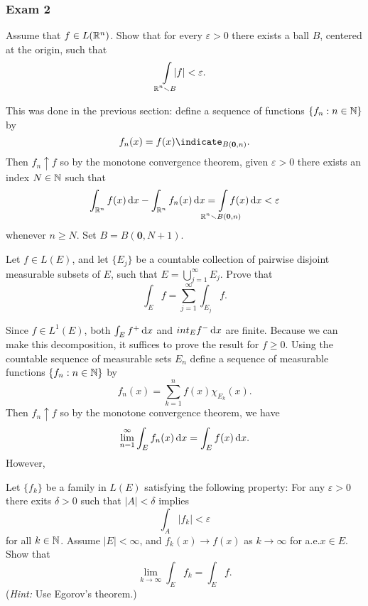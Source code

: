 \subsubsection{Exam 2}
\setcounter{exercise}{0}
\setcounter{equation}{0}

\begin{problem}
  Assume that \(f\in L(\mathbb{R}^n)\). Show that for every \(\varepsilon>0\)
  there exists a ball \(B\), centered at the origin, such that
  \[
    \int\limsclap{\bbR^n\setminus B}|f|<\varepsilon.
  \]
\end{problem}
\begin{solution}
  This was done in the previous section: define a sequence of functions
  \(\{f_n:n\in\mathbb{N}\}\) by
  \[
    f_n(x)=f(x)\indicate_{B(\mathbf{0},n)}.
  \]
  Then \(f_n\uparrow f\) so by the monotone convergence theorem, given
  \(\varepsilon>0\) there exists an index \(N\in\mathbb{N}\) such that
  \[
    \int_{\bbR^n}f(x)\diff x-\int_{\bbR^n}f_n(x)\diff
    x=\int\limsclap{\bbR^n\setminus B(\mathbf{0},n)} f(x)\diff x<\varepsilon
  \]
  whenever \(n\geq N\). Set \(B=B(\mathbf{0},N+1)\).
\end{solution}

\begin{problem}
  Let \(f\in L(E)\), and let \(\{E_j\}\) be a countable collection of
  pairwise disjoint measurable subsets of \(E\), such that
  \(E=\bigcup_{j=1}^\infty E_j\). Prove that
  \[
    \int_E f=\sum_{j=1}^\infty\int_{E_j}f.
  \]
\end{problem}
\begin{solution}
  Since \(f\in L^1(E)\), both \(\int_E f^+\mathop{}\!\mathrm{d} x\) and
  \(int_E f^-\mathop{}\!\mathrm{d} x\) are finite. Because we can make this decomposition,
  it suffices to prove the result for \(f\geq 0\). Using the countable
  sequence of measurable sets \(E_n\) define a sequence of measurable
  functions \(\{f_n:n\in\mathbb{N}\}\) by
  \[
    f_n(x)=\sum_{k=1}^n f(x)\chi_{E_k}(x).
  \]
  Then \(f_n\uparrow f\) so by the monotone convergence theorem, we have
  \[
    \lim_{n=1}^\infty \int_E f_n(x)\mathop{}\!\mathrm{d} x=\int_E f(x)\mathop{}\!\mathrm{d} x.
  \]
  However,
\end{solution}

\begin{problem}
  Let \(\{f_k\}\) be a family in \(L(E)\) satisfying the following
  property: For any \(\varepsilon>0\) there exits \(\delta>0\) such that
  \(|A|<\delta\) implies
  \[
    \int_A |f_k|<\varepsilon
  \]
  for all \(k\in\mathbb{N}\). Assume \(|E|<\infty\), and \(f_k(x)\to f(x)\) as
  \(k\to\infty\) for a.e.\@ \(x\in E\). Show that
  \[
    \lim_{k\to\infty}\int_E f_k=\int_E f.
  \]
  (\emph{Hint:} Use Egorov's theorem.)
\end{problem}
\begin{solution}
\end{solution}

